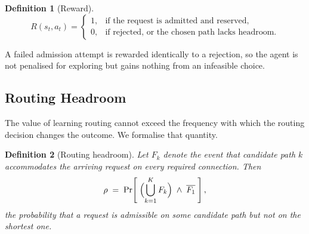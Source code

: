 \documentclass[10pt,journal,comsoc]{IEEEtran}
\newtheorem{definition}{Definition}
\begin{document}
\begin{definition}[Reward]
\label{def:reward}
\begin{equation}
R(s_t,a_t) =
\begin{cases}
1, & \text{if the request is admitted and reserved},\\
0, & \text{if rejected, or the chosen path lacks headroom.}
\end{cases}
\label{eq:reward}
\end{equation}
\end{definition}
A failed admission attempt is rewarded identically to a rejection, so the
agent is not penalised for exploring but gains nothing from an infeasible
choice.

\subsection{Routing Headroom}
The value of learning routing cannot exceed the frequency with which the
routing decision changes the outcome. We formalise that quantity.

\begin{definition}[Routing headroom]
\label{def:rho}
Let $F_k$ denote the event that candidate path $k$ accommodates the
arriving request on every required connection. Then
\begin{equation}
\rho \;=\; \Pr\!\left[\; \Bigl(\bigcup_{k=1}^{K} F_k\Bigr) \;\wedge\; \overline{F_1} \;\right],
\label{eq:rho}
\end{equation}
the probability that a request is admissible on some candidate path but
not on the shortest one.
\end{definition}
\end{document}

